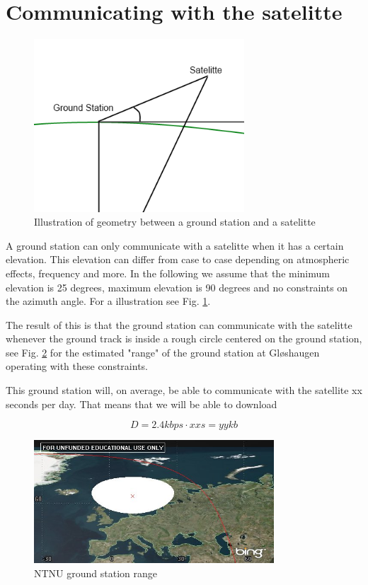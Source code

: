 \section{Communicating with the satelitte}

\begin{figure}
	\begin{center}
		\includegraphics[width=0.7\textwidth]{Figures/groundstation_satelitte_geometry}
	\end{center}
\caption[Ground station satellite geometry]{Illustration of geometry between a ground station and a satelitte}
\label{fig:gs_s_geom}
\end{figure}

A ground station can only communicate with a satelitte when it has a certain elevation. This elevation can differ from case to case depending on atmospheric effects, frequency and more. 
In the following we assume that the minimum elevation is 25 degrees, maximum elevation is 90 degrees and no constraints on the azimuth angle.  For a illustration see Fig. \ref{fig:gs_s_geom}.


The result of this is that the ground station can communicate with the satelitte whenever the ground track is inside a rough circle centered on the ground station, see Fig. \ref{fig:ntnu_range} for the estimated "range" of the ground station at Gløshaugen operating with these constraints.

This ground station will, on average, be able to communicate with the satellite xx seconds per day. That means that we will be able to download

\begin{equation}
D=2.4 kbps \cdot xx s = yy kb
\end{equation} 

\begin{figure}
	\begin{center}
		\includegraphics[width=0.8\textwidth]{Figures/ntnu_footprint}
	\end{center}
\caption[ntnu footprint]{NTNU ground station range}
\label{fig:ntnu_range}
\end{figure}